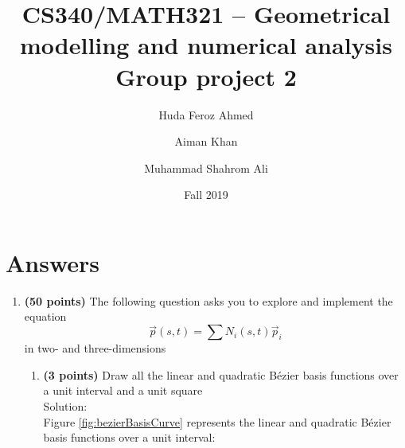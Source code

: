 \documentclass[a4paper, 11pt]{article}
\title{CS340/MATH321 -- Geometrical modelling and numerical analysis \\ Group project 2}
\date{Fall 2019}
\author{Huda Feroz Ahmed \and Aiman Khan \and Muhammad Shahrom Ali}
\begin{document}
\maketitle  
\setlength{\parskip}{10pt}
\setlength{\parindent}{0pt}


\section*{Answers}
\begin{enumerate}
    
\item \textbf{(50 points)} The following question asks you to explore and implement the equation \[\vec p(s, t) = \sum N_i(s, t) \vec p_i\] in two- and three-dimensions

\begin{enumerate}[label=\alph*.]
    \item \textbf{(3 points)} Draw all the linear and quadratic B\'{e}zier basis functions over a unit interval and a unit square \\
    Solution: \\
    Figure \ref{fig:bezierBasisCurve} represents the linear and quadratic B\'{e}zier basis functions over a unit interval: 
    \begin{figure}[h] 
 \quad 
\end{figure}
\end{enumerate}
\end{enumerate}
\end{document}
